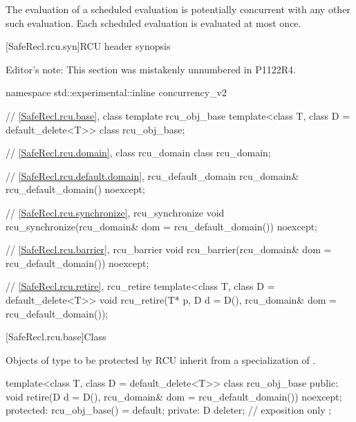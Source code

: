 \pnum
The evaluation of a scheduled evaluation is potentially concurrent with
any other such evaluation. Each scheduled evaluation is evaluated at
most once.

[SafeRecl.rcu.syn]{RCU header  synopsis}

Editor's note: This section was mistakenly unnumbered in P1122R4.


\begin{codeblock}
namespace std::experimental::inline concurrency_v2 {
  // \ref{SafeRecl.rcu.base}, class template rcu_obj_base
  template<class T, class D = default_delete<T>>
    class rcu_obj_base;

  // \ref{SafeRecl.rcu.domain}, class rcu_domain
  class rcu_domain;

  // \ref{SafeRecl.rcu.default.domain}, rcu_default_domain
  rcu_domain& rcu_default_domain() noexcept;

  // \ref{SafeRecl.rcu.synchronize}, rcu_synchronize
  void rcu_synchronize(rcu_domain& dom = rcu_default_domain()) noexcept;

  // \ref{SafeRecl.rcu.barrier}, rcu_barrier
  void rcu_barrier(rcu_domain& dom = rcu_default_domain()) noexcept;

  // \ref{SafeRecl.rcu.retire}, rcu_retire
  template<class T, class D = default_delete<T>>
    void rcu_retire(T* p, D d = D(), rcu_domain& dom = rcu_default_domain());
}
\end{codeblock}

[SafeRecl.rcu.base]{Class }


Objects of type  to be protected by RCU inherit from a
specialization of .


\begin{codeblock}
template<class T, class D = default_delete<T>>
class rcu_obj_base {
public:
  void retire(D d = D(), rcu_domain& dom = rcu_default_domain()) noexcept;
protected:
  rcu_obj_base() = default;
private:
  D deleter;  // exposition only
};
\end{codeblock}

